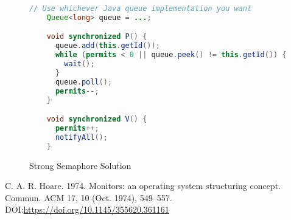 \documentclass{article}
\begin{document}
\begin{figure}
  \begin{lstlisting}[language=java,basicstyle=\small\ttfamily]
    // Use whichever Java queue implementation you want
    Queue<long> queue = ...;

    void synchronized P() {
      queue.add(this.getId());
      while (permits < 0 || queue.peek() != this.getId()) {
        wait();
      }
      queue.poll();
      permits--;
    }

    void synchronized V() {
      permits++;
      notifyAll();
    }
  \end{lstlisting}
  \caption{Strong Semaphore Solution}
  \label{s_correct}
\end{figure}

\begin{thebibliography}{9}

C. A. R. Hoare. 1974.
Monitors: an operating system structuring concept.
Commun. ACM 17, 10 (Oct. 1974), 549–557.
DOI:\url{https://doi.org/10.1145/355620.361161}
\end{thebibliography}
\end{document}
